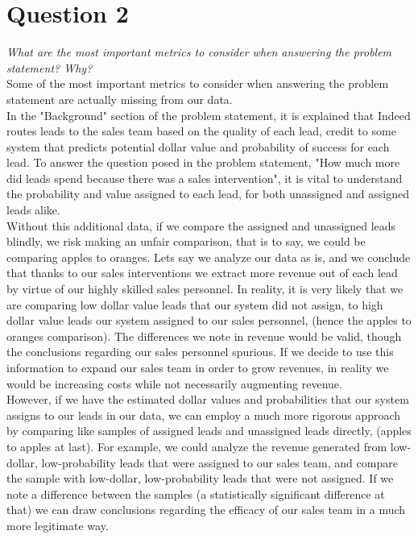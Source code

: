 \documentclass[11pt]{article}
\begin{document}
\newpage

\section{Question 2}
\textit{What are the most important metrics to consider when answering the problem
statement? Why?} \\

Some of the most important metrics to consider when answering the problem statement are actually missing from our data. \\

In the "Background" section of the problem statement, it is explained that Indeed routes leads to the sales team based on the quality of each lead, credit to some system that predicts potential dollar value and probability of success for each lead. To answer the question posed in the problem statement, "How much more did leads spend because there was a sales intervention", it is vital to understand the probability and value assigned to each lead, for both unassigned and assigned leads alike. \\

Without this additional data, if we compare the assigned and unassigned leads blindly, we risk making an unfair comparison, that is to say, we could be comparing apples to oranges. Lets say we analyze our data as is, and we conclude that thanks to our sales interventions we extract more revenue out of each lead by virtue of our highly skilled sales personnel. In reality, it is very likely that we are comparing low dollar value leads that our system did not assign, to high dollar value leads our system assigned to our sales personnel, (hence the apples to oranges comparison). The differences we note in revenue would be valid, though the conclusions regarding our sales personnel spurious. If we decide to use this information to expand our sales team in order to grow revenues, in reality we would be increasing costs while not necessarily augmenting revenue. \\

However, if we have the estimated dollar values and probabilities that our system assigns to our leads in our data, we can employ a much more rigorous approach by comparing like samples of assigned leads and unassigned leads directly, (apples to apples at last). For example, we could analyze the revenue generated from low-dollar, low-probability leads that were assigned to our sales team, and compare the sample with low-dollar, low-probability leads that were not assigned. If we note a difference between the samples (a statistically significant difference at that) we can draw conclusions regarding the efficacy of our sales team in a much more legitimate way.  \\
\end{document}
